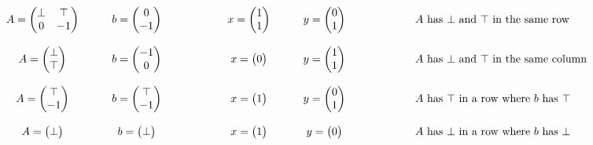 \documentclass[]{article}
\renewcommand{\.}{\hskip .75pt}
\begin{document}
$$
\begin{array}{c@{\hspace{30pt}}c@{\hspace{60pt}}c@{\hspace{30pt}}c@{\hspace{60pt}}l}
A =
\begin{pmatrix}
	\bot & \top \\
	0 & -1
\end{pmatrix}
&
b = \begin{pmatrix} 0 \\ -1 \end{pmatrix}
&
x = \begin{pmatrix} 1 \\ 1 \end{pmatrix}
&
y = \begin{pmatrix} 0 \\ 1 \end{pmatrix}
&
\mbox{ $A$ has $\bot$ and $\top$ in the same row}
%
\vspace{12pt} \\
%
A = \begin{pmatrix} \bot \\ \top \end{pmatrix}
&
b = \begin{pmatrix} -1 \\ 0 \end{pmatrix}
&
x = \begin{pmatrix} 0 \end{pmatrix}
&
y = \begin{pmatrix} 1 \\ 1 \end{pmatrix}
&
\mbox{ $A$ has $\bot$ and $\top$ in the same column}
%
\vspace{12pt} \\
%
A = \begin{pmatrix} \top \\ -1 \end{pmatrix}
&
b = \begin{pmatrix} \top \\ -1 \end{pmatrix}
&
x = \begin{pmatrix} 1 \end{pmatrix}
&
y = \begin{pmatrix} 0 \\ 1 \end{pmatrix}
&
\mbox{ $A$ has $\top$ in a row where $b$ has $\top$}
%
\vspace{12pt} \\
%
A = \begin{pmatrix} \bot \end{pmatrix}
&
b = \begin{pmatrix} \bot \end{pmatrix}
&
x = \begin{pmatrix} 1 \end{pmatrix}
&
y = \begin{pmatrix} 0 \end{pmatrix}
&
\mbox{ $A$ has $\bot$ in a row where $b$ has $\bot$}
\end{array}
\vspace{12pt} \\
$$
\end{document}
